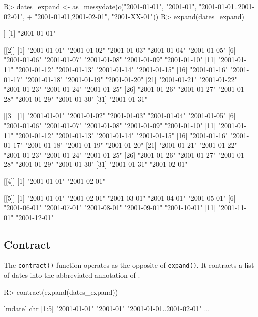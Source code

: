 \documentclass[
]{jss}
\begin{document}
\begin{CodeChunk}
\begin{CodeInput}
R> dates_expand <- as_messydate(c("2001-01-01", "2001-01", "2001-01-01..2001-02-01",
+                                "{2001-01-01,2001-02-01}", "2001-XX-01"))
R> expand(dates_expand)
\end{CodeInput}
\begin{CodeOutput}
[[1]]
[1] "2001-01-01"

[[2]]
 [1] "2001-01-01" "2001-01-02" "2001-01-03" "2001-01-04" "2001-01-05"
 [6] "2001-01-06" "2001-01-07" "2001-01-08" "2001-01-09" "2001-01-10"
[11] "2001-01-11" "2001-01-12" "2001-01-13" "2001-01-14" "2001-01-15"
[16] "2001-01-16" "2001-01-17" "2001-01-18" "2001-01-19" "2001-01-20"
[21] "2001-01-21" "2001-01-22" "2001-01-23" "2001-01-24" "2001-01-25"
[26] "2001-01-26" "2001-01-27" "2001-01-28" "2001-01-29" "2001-01-30"
[31] "2001-01-31"

[[3]]
 [1] "2001-01-01" "2001-01-02" "2001-01-03" "2001-01-04" "2001-01-05"
 [6] "2001-01-06" "2001-01-07" "2001-01-08" "2001-01-09" "2001-01-10"
[11] "2001-01-11" "2001-01-12" "2001-01-13" "2001-01-14" "2001-01-15"
[16] "2001-01-16" "2001-01-17" "2001-01-18" "2001-01-19" "2001-01-20"
[21] "2001-01-21" "2001-01-22" "2001-01-23" "2001-01-24" "2001-01-25"
[26] "2001-01-26" "2001-01-27" "2001-01-28" "2001-01-29" "2001-01-30"
[31] "2001-01-31" "2001-02-01"

[[4]]
[1] "2001-01-01" "2001-02-01"

[[5]]
 [1] "2001-01-01" "2001-02-01" "2001-03-01" "2001-04-01" "2001-05-01"
 [6] "2001-06-01" "2001-07-01" "2001-08-01" "2001-09-01" "2001-10-01"
[11] "2001-11-01" "2001-12-01"
\end{CodeOutput}
\end{CodeChunk}

\hypertarget{contract}{%
\subsection{Contract}\label{contract}}

The \texttt{contract()} function operates as the opposite of
\texttt{expand()}. It contracts a list of dates into the abbreviated
annotation of .

\begin{CodeChunk}
\begin{CodeInput}
R> contract(expand(dates_expand))
\end{CodeInput}
\begin{CodeOutput}
 'mdate' chr [1:5] "2001-01-01" "2001-01" "2001-01-01..2001-02-01" ...
\end{CodeOutput}
\end{CodeChunk}
\end{document}
